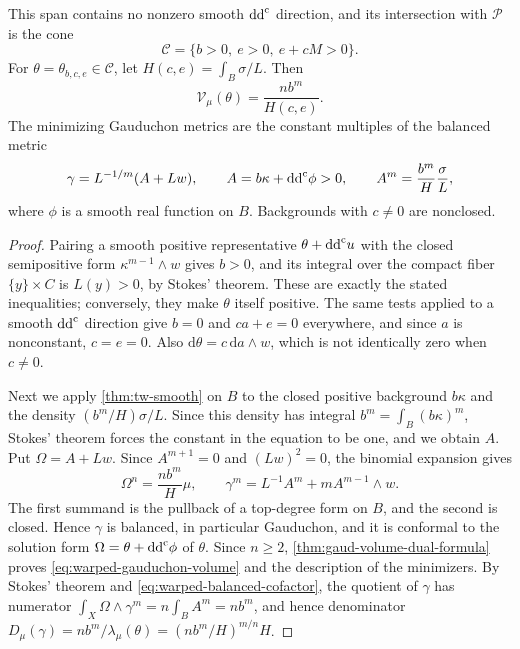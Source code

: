 \begin{theorem}\label{thm:warped-gauduchon-volume}
This span contains no nonzero smooth $\mathrm{dd}^{\mathrm{c}}$ direction, and its intersection with $\mathscr P$ is the cone
\[
 \mathscr C=\{b>0,\ e>0,\ e+cM>0\}.
\]
For $\theta=\theta_{b,c,e}\in\mathscr C$, let $H(c,e)=\int_B\sigma/L$. Then
\begin{equation}\label{eq:warped-gauduchon-volume}
 \mathcal V_\mu(\theta)=\frac{nb^m}{H(c,e)}.
\end{equation}
The minimizing Gauduchon metrics are the constant multiples of the balanced metric
\[
 \gamma=L^{-1/m}(A+Lw),\qquad
 A=b\kappa+\mathrm{dd}^{\mathrm{c}}\phi>0,\qquad
 A^m=\frac{b^m}{H}\frac{\sigma}{L},
\]
where $\phi$ is a smooth real function on $B$. Backgrounds with $c\ne0$ are nonclosed.
\end{theorem}
\begin{proof}
Pairing a smooth positive representative $\theta+\mathrm{dd}^{\mathrm{c}} u$ with the closed semipositive form $\kappa^{m-1}\wedge w$ gives $b>0$, and its integral over the compact fiber $\{y\}\times C$ is $L(y)>0$, by Stokes' theorem. These are exactly the stated inequalities; conversely, they make $\theta$ itself positive. The same tests applied to a smooth $\mathrm{dd}^{\mathrm{c}}$ direction give $b=0$ and $ca+e=0$ everywhere, and since $a$ is nonconstant, $c=e=0$. Also $\mathrm{d}\theta=c\,\mathrm{d}a\wedge w$, which is not identically zero when $c\ne0$.

Next we apply \cref{thm:tw-smooth} on $B$ to the closed positive background $b\kappa$ and the density $(b^m/H)\sigma/L$. Since this density has integral $b^m=\int_B(b\kappa)^m$, Stokes' theorem forces the constant in the equation to be one, and we obtain $A$. Put $\Omega=A+Lw$. Since $A^{m+1}=0$ and $(Lw)^2=0$, the binomial expansion gives
\begin{equation}\label{eq:warped-balanced-cofactor}
 \Omega^n=\frac{nb^m}{H}\mu,\qquad
 \gamma^m=L^{-1}A^m+mA^{m-1}\wedge w.
\end{equation}
The first summand is the pullback of a top-degree form on $B$, and the second is closed. Hence $\gamma$ is balanced, in particular Gauduchon, and it is conformal to the solution form $\Omega=\theta+\mathrm{dd}^{\mathrm{c}}\phi$ of $\theta$. Since $n\geq2$, \cref{thm:gaud-volume-dual-formula} proves \eqref{eq:warped-gauduchon-volume} and the description of the minimizers. By Stokes' theorem and \eqref{eq:warped-balanced-cofactor}, the quotient of $\gamma$ has numerator $\int_X\Omega\wedge\gamma^m=n\int_BA^m=nb^m$, and hence denominator $D_\mu(\gamma)=nb^m/\lambda_\mu(\theta)=(nb^m/H)^{m/n}H$.
\end{proof}

